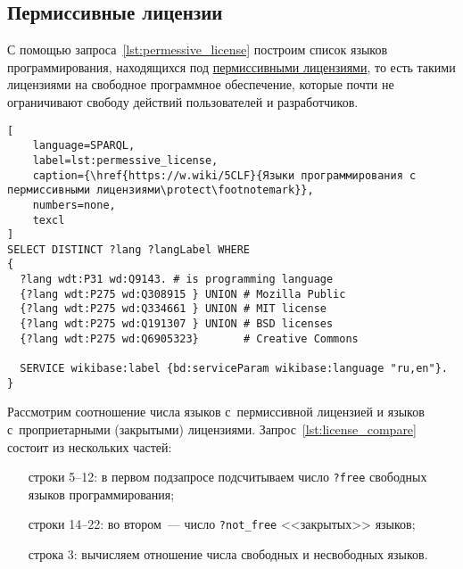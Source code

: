 \subsection{Пермиссивные лицензии}
%
С помощью запроса~\ref{lst:permessive_license} 
построим список языков программирования, 
находящихся под \href{https://en.wikipedia.org/wiki/Permissive_software_license}{пермиссивными лицензиями}, 
то есть такими лицензиями на свободное программное обеспечение, 
которые почти не ограничивают свободу действий пользователей и разработчиков. 
%

\begin{lstlisting}[
	language=SPARQL,
	label=lst:permessive_license,
    caption={\href{https://w.wiki/5CLF}{Языки программирования с пермиссивными лицензиями\protect\footnotemark}},
    numbers=none,
	texcl
]
SELECT DISTINCT ?lang ?langLabel WHERE
{
  ?lang wdt:P31 wd:Q9143. # is programming language
  {?lang wdt:P275 wd:Q308915 } UNION # Mozilla Public
  {?lang wdt:P275 wd:Q334661 } UNION # MIT license
  {?lang wdt:P275 wd:Q191307 } UNION # BSD licenses
  {?lang wdt:P275 wd:Q6905323}       # Creative Commons

  SERVICE wikibase:label {bd:serviceParam wikibase:language "ru,en"}.
}
\end{lstlisting}



Рассмотрим соотношение числа языков с~пермиссивной лицензией 
и языков с~проприетарными (закрытыми) лицензиями.
Запрос~\ref{lst:license_compare} состоит из нескольких частей: 
\begin{enumerate}[%
                  font=\sffamily\bfseries, 
                  leftmargin=8em,
                 ]
    \item[строки 5--12:] в первом подзапросе подсчитываем число \texttt{?free} свободных языков программирования;
    \item[строки 14--22:] во втором~--- число \texttt{?not\_free} <<закрытых>> языков;
    \item[строка 3:] вычисляем отношение числа свободных и несвободных языков.
\end{enumerate}


